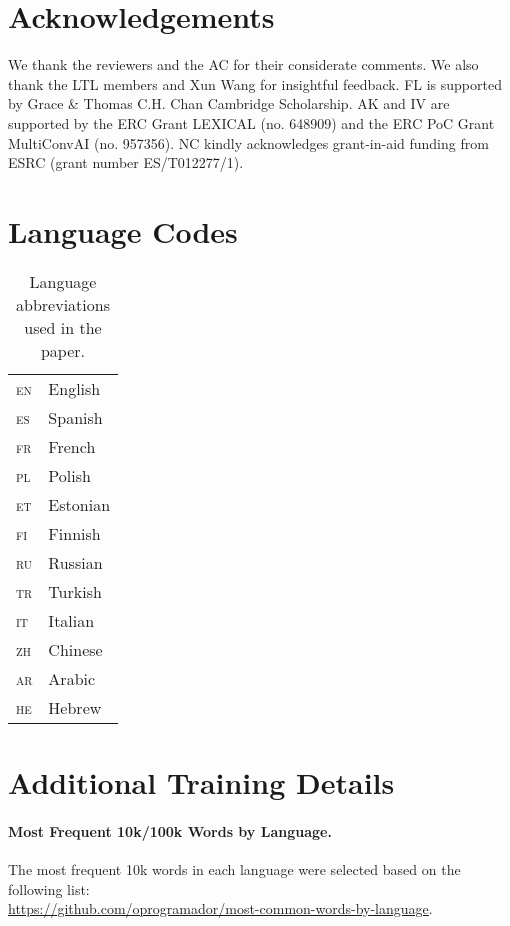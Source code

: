 \documentclass[11pt]{article}
\newcommand{\en}{{\textsc{en}}\xspace}
\newcommand{\es}{{\textsc{es}}\xspace}
\newcommand{\zh}{{\textsc{zh}}\xspace}
\newcommand{\tr}{{\textsc{tr}}\xspace}
\newcommand{\fin}{{\textsc{fi}}\xspace}
\newcommand{\ru}{{\textsc{ru}}\xspace}
\newcommand{\fr}{{\textsc{fr}}\xspace}
\newcommand{\ita}{{\textsc{it}}\xspace}
\newcommand{\et}{{\textsc{et}}\xspace}
\newcommand{\pl}{{\textsc{pl}}\xspace}
\newcommand{\ar}{{\textsc{ar}}\xspace}
\newcommand{\he}{{\textsc{he}}\xspace}
\begin{document}
\section*{Acknowledgements}
We thank the reviewers and the AC for their considerate comments. We also thank the LTL members and Xun Wang for insightful feedback. FL is supported by Grace \& Thomas C.H. Chan Cambridge Scholarship. AK and IV are supported by the ERC Grant LEXICAL (no. 648909) and the ERC PoC Grant MultiConvAI (no. 957356). NC kindly acknowledges grant-in-aid funding from ESRC (grant number ES/T012277/1).




\clearpage
\appendix

\section{Language Codes}\label{sec:appendix_lang_code}
\begin{table}[!h]
    \centering
    \begin{tabular}{ll}
    \toprule
         \en & English  \\
         \es & Spanish \\
         \fr & French \\
         \pl & Polish \\
         \et & Estonian \\
         \fin & Finnish \\
         \ru & Russian \\
         \tr & Turkish \\
         \ita & Italian \\
         \zh & Chinese \\
         \ar & Arabic \\
         \he & Hebrew \\
    \bottomrule
    \end{tabular}
    \caption{Language abbreviations used in the paper.}
  \label{tab:lang_code}
\end{table}

\section{Additional Training Details}
\paragraph{Most Frequent 10k/100k Words by Language.} The most frequent 10k words in each language were selected based on the following list: \\ \url{https://github.com/oprogramador/most-common-words-by-language}. 
\end{document}
